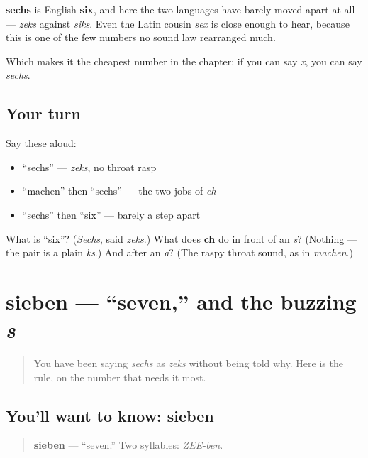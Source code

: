 \begin{cousinweb}
\textbf{sechs} is English \textbf{six}, and here the two languages have barely moved apart at all — \emph{zeks} against \emph{siks}. Even the Latin cousin \emph{sex} is close enough to hear, because this is one of the few numbers no sound law rearranged much.

Which makes it the cheapest number in the chapter: if you can say \emph{x}, you can say \emph{sechs}.
\end{cousinweb}

\subsection*{Your turn}
Say these aloud:

\begin{itemize}
\raggedright
  \item \textquotedblleft{}sechs\textquotedblright{} — \emph{zeks}, no throat rasp
  \item \textquotedblleft{}machen\textquotedblright{} then \textquotedblleft{}sechs\textquotedblright{} — the two jobs of \emph{ch}
  \item \textquotedblleft{}sechs\textquotedblright{} then \textquotedblleft{}six\textquotedblright{} — barely a step apart
\end{itemize}

\begin{tcolorbox}[breakable,colback=teal!4,colframe=teal!35!black,title={Before you move on}]
What is \textquotedblleft{}six\textquotedblright{}? (\emph{Sechs}, said \emph{zeks}.) What does \textbf{ch} do in front of an \emph{s}? (Nothing — the pair is a plain \emph{ks}.) And after an \emph{a}? (The raspy throat sound, as in \emph{machen}.)
\end{tcolorbox}
\section[sieben]{sieben — \textquotedblleft{}seven,\textquotedblright{} and the buzzing \emph{s}}

\label{lesson:GE-C06-sieben}



\begin{quote}
You have been saying \emph{sechs} as \emph{zeks} without being told why. Here is the rule, on the number that needs it most.
\end{quote}

\subsection*{You'll want to know: sieben}
\begin{quote}
\textbf{sieben} — \textquotedblleft{}seven.\textquotedblright{} Two syllables: \emph{ZEE-ben}.
\end{quote}

